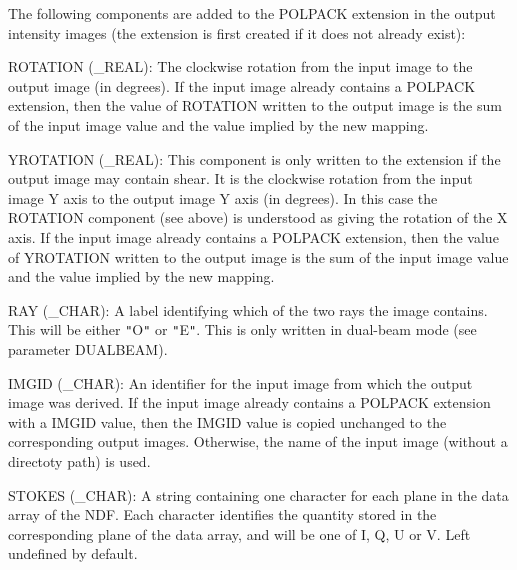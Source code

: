 {{{         \sstitem
         The following components are added to the POLPACK extension in the
         output intensity images (the extension is first created if it does
         not already exist):

      }
      ROTATION (\_REAL): The clockwise rotation from the input
      image to the output image (in degrees). If the input image already
      contains a POLPACK extension, then the value of ROTATION written to the
      output image is the sum of the input image value and the value
      implied by the new mapping.

      YROTATION (\_REAL): This component is only written to the extension
      if the output image may contain shear. It is the clockwise
      rotation from the input image Y axis to the output image Y axis (in
      degrees). In this case the ROTATION component (see above) is understood
      as giving the rotation of the X axis. If the input image already
      contains a POLPACK extension, then the value of YROTATION written to the
      output image is the sum of the input image value and the value
      implied by the new mapping.

      RAY (\_CHAR): A label identifying which of the two rays the image
      contains. This will be either {\tt "}O{\tt "} or {\tt "}E{\tt "}. This is only written in
      dual-beam mode (see parameter DUALBEAM).

      IMGID (\_CHAR): An identifier for the input image from which the
      output image was derived. If the input image already contains a
      POLPACK extension with a IMGID value, then the IMGID value is copied
      unchanged to the corresponding output images. Otherwise, the name of
      the input image (without a directoty path) is used.

      STOKES (\_CHAR):  A string containing one character for each plane in
      the data array of the NDF. Each character identifies the quantity
      stored in the corresponding plane of the data array, and will be one
      of I, Q, U or V. Left undefined by default.
   }
}
